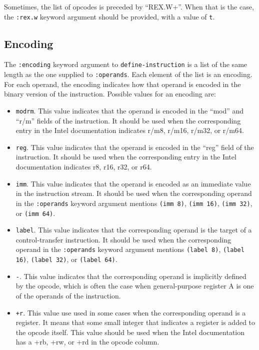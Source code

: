 Sometimes, the list of opcodes is preceded by ``REX.W+''.  When that
is the case, the \texttt{:rex.w} keyword argument should be provided,
with a value of \texttt{t}.

\subsection{Encoding}

The \texttt{:encoding} keyword argument to \texttt{define-instruction}
is a list of the same length as the one supplied to
\texttt{:operands}.  Each element of the list is an encoding.  For
each operand, the encoding indicates how that operand is encoded in
the binary version of the instruction.  Possible values for an
encoding are:

\begin{itemize}
\item \texttt{modrm}.  This value indicates that the operand is encoded in the
  ``mod'' and ``r/m'' fields of the instruction.  It should be used
  when the corresponding entry in the Intel documentation indicates
  r/m8, r/m16, r/m32, or r/m64.
\item \texttt{reg}.  This value indicates that the operand is encoded
  in the ``reg'' field of the instruction.  It should be used when the
  corresponding entry in the Intel documentation indicates r8, r16,
  r32, or r64.
\item \texttt{imm}.  This value indicates that the operand is encoded
  as an immediate value in the instruction stream.  It should be used
  when the corresponding operand in the \texttt{:operands} keyword
  argument mentions \texttt{(imm 8)}, \texttt{(imm 16)}, \texttt{(imm
    32)}, or \texttt{(imm 64)}.
\item \texttt{label}.  This value indicates that the corresponding
  operand is the target of a control-transfer instruction.  It should
  be used when the corresponding operand in the \texttt{:operands}
  keyword argument mentions \texttt{(label 8)}, \texttt{(label 16)},
  \texttt{(label 32)}, or \texttt{(label 64)}.
\item \texttt{-}.  This value indicates that the corresponding operand
  is implicitly defined by the opcode, which is often the case when
  general-purpose register A is one of the operands of the
  instruction.
\item \texttt{+r}.  This value use used in some cases when the
  corresponding operand is a register.  It means that some small
  integer that indicates a register is added to the opcode itself.
  This value should be used when the Intel documentation has a +rb,
  +rw, or +rd in the opcode column.
\end{itemize}

